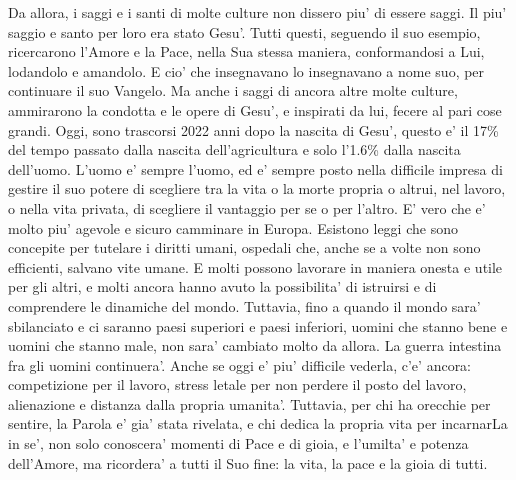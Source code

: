 {  Da allora, i saggi e i santi di molte culture non dissero piu' di essere saggi. Il piu' saggio e santo per loro era stato Gesu'. Tutti questi, seguendo il suo esempio, ricercarono l'Amore e la Pace, nella Sua stessa maniera, conformandosi a Lui, lodandolo e amandolo. E cio' che insegnavano lo insegnavano a nome suo, per continuare il suo Vangelo. Ma anche i saggi di ancora altre molte culture, ammirarono la condotta e le opere di Gesu', e inspirati da lui, fecere al pari cose grandi.
  Oggi, sono trascorsi 2022 anni dopo la nascita di Gesu', questo e' il 17\% del tempo passato dalla nascita dell'agricultura e solo l'1.6\% dalla nascita dell'uomo.
  L'uomo e' sempre l'uomo, ed e' sempre posto nella difficile impresa di gestire il suo potere di scegliere tra la vita o la morte propria o altrui, nel lavoro, o nella vita privata, di scegliere il vantaggio per se o per l'altro.
E' vero che e' molto piu' agevole e sicuro camminare in Europa. Esistono leggi che sono concepite per tutelare i diritti umani, ospedali che, anche se a volte non sono efficienti, salvano vite umane. E molti possono lavorare in maniera onesta e utile per gli altri, e molti ancora hanno avuto la possibilita' di istruirsi e di comprendere le dinamiche del mondo.
Tuttavia, fino a quando il mondo sara' sbilanciato e ci saranno paesi superiori e paesi inferiori, uomini che stanno bene e uomini che stanno male, non sara' cambiato molto da allora. La guerra intestina fra gli uomini continuera'. Anche se oggi e' piu' difficile vederla, c'e' ancora: competizione per il lavoro, stress letale per non perdere il posto del lavoro, alienazione e distanza dalla propria umanita'.
  Tuttavia, per chi ha orecchie per sentire, la Parola e' gia' stata rivelata, e chi dedica la propria vita per incarnarLa in se', non solo conoscera' momenti di Pace e di gioia, e l'umilta' e potenza dell'Amore, ma ricordera' a tutti il Suo fine: la vita, la pace e la gioia di tutti.}



